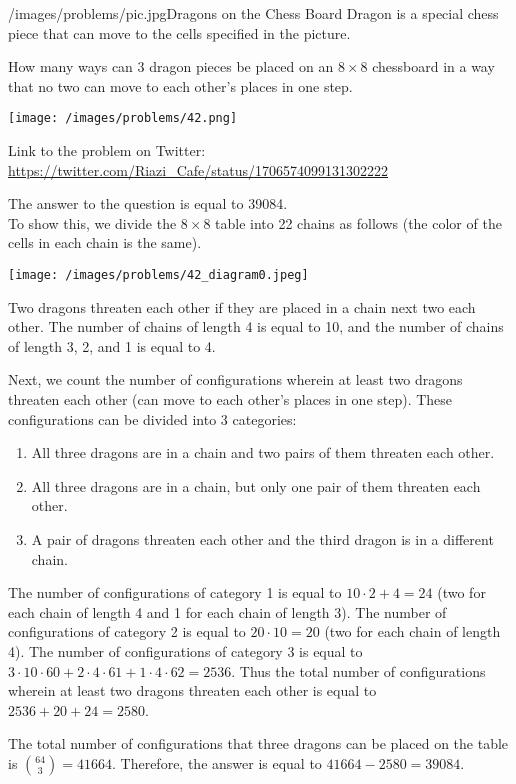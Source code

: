 \begin{problem}{/images/problems/pic.jpg}{Dragons on the Chess Board}
	Dragon is a special chess piece that can move to the cells specified in the picture.

How many ways can 3 dragon pieces be placed on an $8\times8$ chessboard in a way that no two can move to each other's places in one step.

\begin{center}
	\texttt{[image: /images/problems/42.png]}
\end{center}


Link to the problem on Twitter:  \url{https://twitter.com/Riazi_Cafe/status/1706574099131302222}
\end{problem}
\begin{solution}
The answer to the question is equal to 39084.\\[0.2cm]

To show this, we divide the $8 \times 8$ table into 22 chains as follows (the color of the cells in each chain is the same).

\begin{center}
	\texttt{[image: /images/problems/42\_diagram0.jpeg]}
\end{center}

Two dragons threaten each other if they are placed in a chain next two each other.
The number of chains of length 4 is equal to 10, and the number of chains of length 3, 2, and 1 is equal to 4.

Next, we count the number of configurations wherein at least two dragons threaten each other (can move to each other's places in one step). These configurations can be divided into 3 categories:

\begin{enumerate}
\item All three dragons are in a chain and two pairs of them threaten each other.
\item All three dragons are in a chain, but only one pair of them threaten each other.
\item A pair of dragons threaten each other and the third dragon is in a different chain.
\end{enumerate}

The number of configurations of category 1 is equal to $10 \cdot 2 + 4 = 24$ (two for each chain of length 4 and 1 for each chain of length 3).
The number of configurations of category 2 is equal to $20 \cdot 10 = 20$ (two for each chain of length 4).
The number of configurations of category 3 is equal to $3 \cdot 10 \cdot 60 + 2 \cdot 4 \cdot 61 + 1 \cdot 4 \cdot 62 = 2536$.
Thus the total number of configurations wherein at least two dragons threaten each other is equal to $2536 + 20 + 24 = 2580$.

The total number of configurations that three dragons can be placed on the table is $\binom{64}{3} = 41664$.
Therefore, the answer is equal to $41664 - 2580 = 39084$.

\end{solution}
